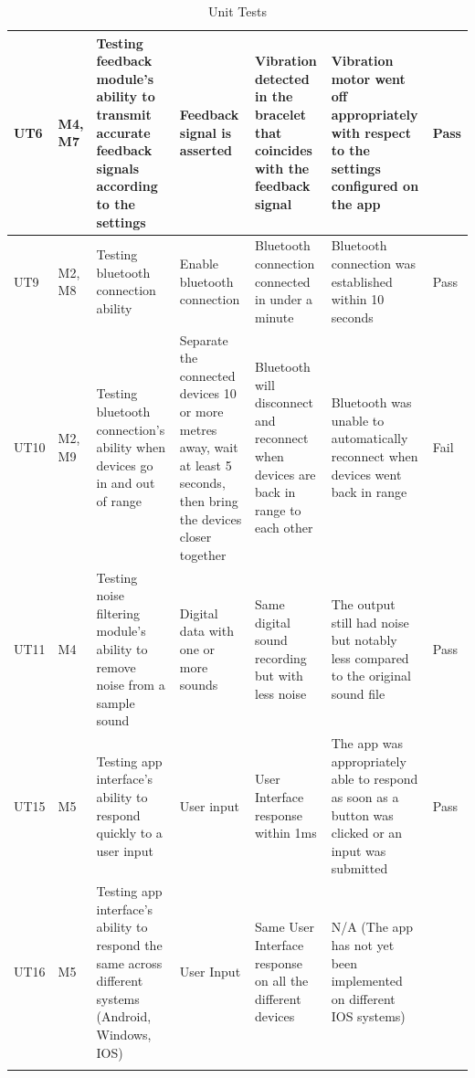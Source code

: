 \documentclass[12pt, titlepage]{article}
\begin{document}
\begin{longtable}{|p{1.4cm}|p{1.1cm}|p{2.5cm}|p{1.5cm}|p{2.2cm}|p{1.9cm}|p{1.2cm}|}
  UT6       &   M4, M7   & Testing feedback module's ability to transmit accurate feedback signals according to the settings  & Feedback signal is asserted              & Vibration detected in the bracelet that coincides with the feedback signal                          &      Vibration motor went off appropriately with respect to the settings configured on the app                        &   {\color[HTML]{32CB00} Pass}                    \\ \hline
  UT9       &   M2, M8   & Testing bluetooth connection ability                                     & Enable bluetooth connection                                  & Bluetooth connection connected in under a minute                    &         Bluetooth connection was established within 10 seconds               &             {\color[HTML]{32CB00} Pass}                                       \\ \hline
  UT10      &   M2, M9   & Testing bluetooth connection's ability when devices go in and out of range                                      & Separate the connected devices 10 or more metres away, wait at least 5 seconds, then bring the devices closer together                                  & Bluetooth will disconnect and reconnect when devices are back in range to each other                    &          Bluetooth was unable to automatically reconnect when devices went back in range            &                         {\color[HTML]{FE0000} Fail}                             \\ \hline
  UT11      &   M4   & Testing noise filtering module's ability to remove noise from a sample sound                                      & Digital data with one or more sounds                                  & Same digital sound recording but with less noise                    &          The output still had noise but notably less compared to the original sound file              &                    {\color[HTML]{32CB00} Pass}                                \\ \hline
  UT15      &   M5   & Testing app interface's ability to respond quickly to a user input                                      & User input                                  & User Interface response within 1ms                    &         The app was appropriately able to respond as soon as a button was clicked or an input was submitted               &                {\color[HTML]{32CB00} Pass}                                    \\ \hline
  UT16      &   M5   & Testing app interface's ability to respond the same across different systems (Android, Windows, IOS)                                      & User Input                                  & Same User Interface response on all the different devices                    &        N/A (The app has not yet been implemented on different IOS systems)                &                  \cellcolor[HTML]{FFFFFF}{\color[HTML]{F8A102} N/A}                                  \\ \hline
  \caption{Unit Tests}
  \label{unitTests}
\end{longtable}
\end{document}
